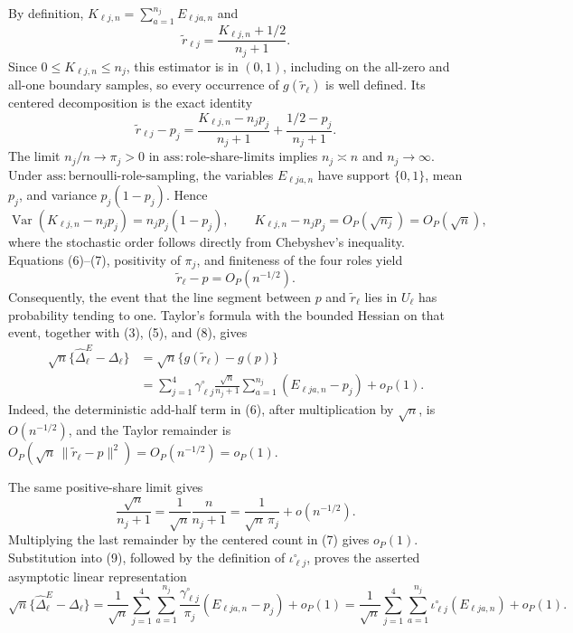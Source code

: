 By definition, \(K_{\ell j,n}=\sum_{a=1}^{n_j}E_{\ell j a,n}\) and
\[
 \widetilde r_{\ell j}=\frac{K_{\ell j,n}+1/2}{n_j+1}.
\]
Since \(0\le K_{\ell j,n}\le n_j\), this estimator is in \((0,1)\), including on the all-zero and all-one boundary samples, so every occurrence of \(g(\widetilde r_\ell)\) is well defined. Its centered decomposition is the exact identity
\[
 \widetilde r_{\ell j}-p_j
 =\frac{K_{\ell j,n}-n_jp_j}{n_j+1}
  +\frac{1/2-p_j}{n_j+1}.
\tag{6}
\]
The limit \(n_j/n\to\pi_j>0\) in \(\mathrm{ass:role\mbox{-}share\mbox{-}limits}\) implies \(n_j\asymp n\) and \(n_j\to\infty\). Under \(\mathrm{ass:bernoulli\mbox{-}role\mbox{-}sampling}\), the variables \(E_{\ell j a,n}\) have support \(\{0,1\}\), mean \(p_j\), and variance \(p_j(1-p_j)\). Hence
\[
 \operatorname{Var}(K_{\ell j,n}-n_jp_j)=n_jp_j(1-p_j),
 \qquad K_{\ell j,n}-n_jp_j=O_P(\sqrt{n_j})=O_P(\sqrt n),
\tag{7}
\]
where the stochastic order follows directly from Chebyshev's inequality. Equations (6)--(7), positivity of \(\pi_j\), and finiteness of the four roles yield
\[
 \widetilde r_\ell-p=O_P(n^{-1/2}).
\tag{8}
\]
Consequently, the event that the line segment between \(p\) and \(\widetilde r_\ell\) lies in \(U_\ell\) has probability tending to one. Taylor's formula with the bounded Hessian on that event, together with (3), (5), and (8), gives
\[
 \begin{aligned}
 \sqrt n\{\widehat\Delta^E_\ell-\Delta_\ell\}
 &=\sqrt n\{g(\widetilde r_\ell)-g(p)\}\\
 &=\sum_{j=1}^4\gamma^{\circ}_{\ell j}
   \frac{\sqrt n}{n_j+1}
   \sum_{a=1}^{n_j}(E_{\ell j a,n}-p_j)+o_P(1).
 \end{aligned}
\tag{9}
\]
Indeed, the deterministic add-half term in (6), after multiplication by \(\sqrt n\), is \(O(n^{-1/2})\), and the Taylor remainder is
\(
O_P(\sqrt n\,\|\widetilde r_\ell-p\|^2)=O_P(n^{-1/2})=o_P(1)
\).

The same positive-share limit gives
\[
 \frac{\sqrt n}{n_j+1}
 =\frac{1}{\sqrt n}\frac{n}{n_j+1}
 =\frac{1}{\sqrt n\,\pi_j}+o(n^{-1/2}).
\tag{10}
\]
Multiplying the last remainder by the centered count in (7) gives \(o_P(1)\). Substitution into (9), followed by the definition of \(\iota^{\circ}_{\ell j}\), proves the asserted asymptotic linear representation
\[
 \sqrt n\{\widehat\Delta^E_\ell-\Delta_\ell\}
 =\frac{1}{\sqrt n}\sum_{j=1}^4\sum_{a=1}^{n_j}
 \frac{\gamma^{\circ}_{\ell j}}{\pi_j}(E_{\ell j a,n}-p_j)+o_P(1)
 =\frac{1}{\sqrt n}\sum_{j=1}^4\sum_{a=1}^{n_j}
 \iota^{\circ}_{\ell j}(E_{\ell j a,n})+o_P(1).
\tag{11}
\]

